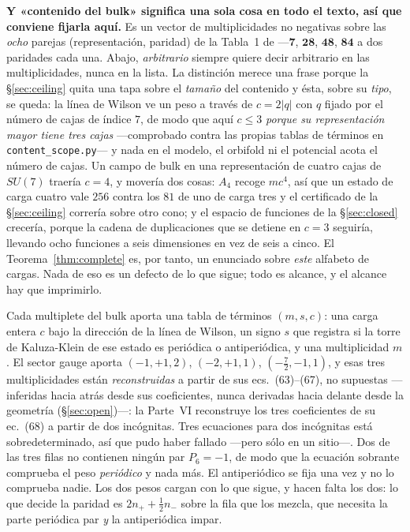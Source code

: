 \documentclass[11pt,a4paper]{article}
\newcommand{\su}[1]{SU(#1)}
\newcommand{\rep}[1]{\mathbf{#1}}
\begin{document}
\noindent \textbf{Y «contenido del bulk» significa una sola cosa en todo el texto, así que conviene
fijarla aquí.} Es un vector de multiplicidades no negativas sobre las \emph{ocho} parejas
(representación, paridad) de la Tabla~1 de \cite{KM25} ---$\rep7$, $\rep{28}$, $\rep{48}$,
$\rep{84}$ a dos paridades cada una. Abajo, \emph{arbitrario} siempre quiere decir arbitrario en las
multiplicidades, nunca en la lista. La distinción merece una frase porque la \S\ref{sec:ceiling}
quita una tapa sobre el \emph{tamaño} del contenido y ésta, sobre su \emph{tipo}, se queda: la línea
de Wilson ve un peso a través de $c=2|q|$ con $q$ fijado por el número de cajas de índice $7$, de
modo que aquí $c\le3$ \emph{porque su representación mayor tiene tres cajas} ---comprobado contra
las propias tablas de términos en \texttt{content\_\allowbreak scope.py}--- y nada en el modelo, el
orbifold ni el potencial acota el número de cajas. Un campo de bulk en una representación de cuatro
cajas de $\su7$ traería $c=4$, y movería dos cosas: $A_4$ recoge $mc^4$, así que un estado de carga
cuatro vale $256$ contra los $81$ de uno de carga tres y el certificado de la \S\ref{sec:ceiling}
correría sobre otro cono; y el espacio de funciones de la \S\ref{sec:closed} crecería, porque la
cadena de duplicaciones que se detiene en $c=3$ seguiría, llevando ocho funciones a seis dimensiones
en vez de seis a cinco. El Teorema~\ref{thm:complete} es, por tanto, un enunciado sobre \emph{este}
alfabeto de cargas. Nada de eso es un defecto de lo que sigue; todo es alcance, y el alcance hay que
imprimirlo.

\noindent Cada multiplete del bulk aporta una tabla de términos $(m,s,c)$: una carga entera $c$ bajo la
dirección de la línea de Wilson, un signo $s$ que registra si la torre de Kaluza-Klein de ese estado
es periódica o antiperiódica, y una multiplicidad $m$. El sector gauge aporta $(-1,+1,2)$,
$(-2,+1,1)$, $(-\tfrac72,-1,1)$, y esas tres multiplicidades están \emph{reconstruidas} a partir de sus
ecs.~(63)--(67), no supuestas ---inferidas hacia atrás desde sus coeficientes, nunca derivadas
hacia delante desde la geometría (\S\ref{sec:open})---: la Parte~VI reconstruye los tres coeficientes de su ec.~(68) a partir
de dos incógnitas. Tres ecuaciones para dos incógnitas está sobredeterminado, así que pudo haber
fallado ---pero sólo en un sitio---. Dos de las tres filas no contienen ningún par $P_6=-1$, de modo
que la ecuación sobrante comprueba el peso \emph{periódico} y nada más. El antiperiódico se fija una
vez y no lo comprueba nadie. Los dos pesos cargan con lo que sigue, y hacen falta los dos: lo que
decide la paridad es $2n_++\tfrac12 n_-$ sobre la fila que los mezcla, que necesita la parte
periódica par \emph{y} la antiperiódica impar.
\end{document}
